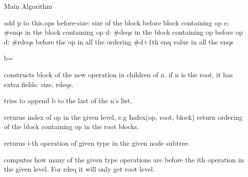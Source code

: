 \documentclass[10pt,table]{article}
\theoremstyle{definition}
\begin{document}
\begin{algorithm}
\caption{Main Algorithm}\label{alg}
\begin{algorithmic}[1]
\onehalfspacing


\State add p to this.ops
\State {}
\State {}
\State before-size: size of the block before block containing op
\State e: \#enqs in the block containing op
\State d: \#deqs in the block containing op before op
\State {}
\Else{}
\State d: \#rdeqs before the op in all the ordering
\State {} \#d+1th enq value in all the enqs
\EndIf
\EndIf
\EndFunction
\Statex

\State b=
\EndIf
\State {}
\EndFunction
\Statex

\Statex \Comment constructs block of the new operation in children of n. if n is the root, it has extra fields: size, rdeqs.
\EndFunction
\Statex

\Statex \Comment tries to append b to the last of the n's list.
\EndFunction
\Statex

\Statex \Comment returns index of op in the given level, e.g  Index(op, root, block) return ordering of the block containing op in the root blocks.
\EndFunction
\Statex

\Statex \Comment returns i-th operation of given type in the given node subtree.
\EndFunction
\Statex

\Statex \Comment computes how many of the given type operations are before the ith operation in the given level. For rdeq it will only get root level.
\EndFunction


\end{algorithmic}
\end{algorithm}
\end{document}
